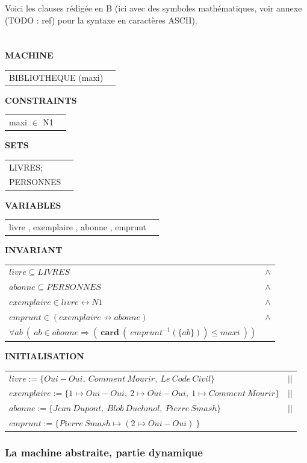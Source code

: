 \documentclass[10pt,a4paper]{article}
\begin{document}
Voici les clauses rédigée en B (ici avec des symboles mathématiques, voir annexe (TODO : ref) pour la syntaxe en caractères ASCII).
\\
\\
\\
\setlength{\LTpre}{\medskipamount} %
\setlength{\LTpost}{0pt}
\setlength\LTleft{\parindent}
\textbf{MACHINE}
\begin{longtable}{ll} BIBLIOTHEQUE (maxi) \end{longtable}
\noindent\textbf{CONSTRAINTS}
\begin{longtable}{ll} maxi $\in$ N1 \end{longtable}
\noindent\textbf{SETS}
\begin{longtable}{ll} LIVRES; \\ PERSONNES\\ \end{longtable}
\noindent\textbf{VARIABLES}
\begin{longtable}{ll} livre , exemplaire , abonne , emprunt \end{longtable}
\noindent\textbf{INVARIANT}
\begin{longtable}{ll}
$livre \subseteq LIVRES $ & $\wedge$ \tabularnewline
$abonne \subseteq PERSONNES$ & $\wedge$ \tabularnewline
$exemplaire \in livre \leftrightarrow N1$ & $\wedge$ \tabularnewline
$emprunt \in ( exemplaire \nrightarrow abonne )$ & $\wedge$ \tabularnewline
$\forall ab\ (\ ab \in abonne \Rightarrow (\ \textbf{card}\ (\ emprunt ^{-1}(\{ab\})) \leq maxi\ ))$ &
\end{longtable}
\noindent\textbf{INITIALISATION}
\begin{longtable}{ll}
$livre := \{Oui-Oui,\ Comment\ Mourir,\ Le\ Code\ Civil\} $& $||$ \tabularnewline
$exemplaire := \{1 \mapsto Oui-Oui,\ 2 \mapsto Oui-Oui,\ 1 \mapsto Comment\ Mourir\}$ & $||$ \tabularnewline
$abonne := \{Jean\ Dupont,\ Blob\ Duchmol,\ Pierre\ Smash\} $& $||$ \tabularnewline
$emprunt := \{Pierre\ Smash \mapsto ( 2 \mapsto Oui-Oui)\ \}$ &
\end{longtable}

\subsubsection{La machine abstraite, partie dynamique}
\end{document}
